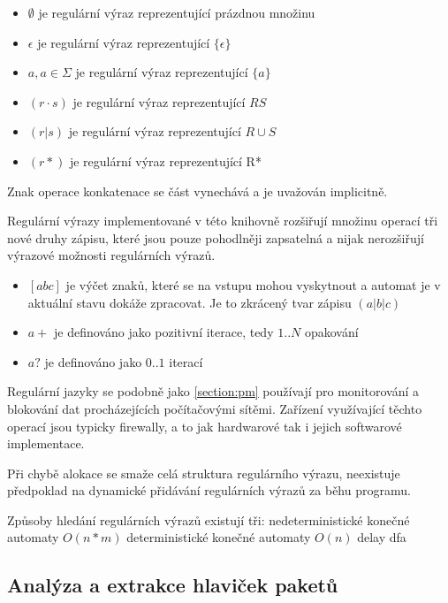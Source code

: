 \begin{itemize}
	\item{$\emptyset$ je regulární výraz reprezentující prázdnou množinu}
	\item{$\epsilon$ je regulární výraz reprezentující $\{\epsilon\}$}
	\item{$a, a \in \Sigma$ je regulární výraz reprezentující $\{a\}$}
	\item{$(r \cdot s)$ je regulární výraz reprezentující $RS$}
	\item{$(r | s)$ je regulární výraz reprezentující $R \cup S$}
	\item{$(r*)$ je regulární výraz reprezentující R*}
\end{itemize}

Znak operace konkatenace %
se část vynechává a je uvažován implicitně.

Regulární výrazy implementované v této knihovně rozšiřují množinu operací tři nové druhy zápisu,
které jsou pouze pohodlněji zapsatelná a nijak nerozšiřují výrazové možnosti regulárních výrazů.

\begin{itemize}
	\item{$[abc]$ je výčet znaků, které se na vstupu mohou vyskytnout a automat je v aktuální stavu dokáže zpracovat. Je to zkrácený tvar zápisu $(a|b|c)$}
	\item{$a+$ je definováno jako pozitivní iterace, tedy $1..N$ opakování}
	\item{$a?$ je definováno jako $0..1$ iterací}
\end{itemize}

Regulární jazyky se podobně jako \ref{section:pm} používají pro monitorování a blokování dat procházejících
počítačovými sítěmi. Zařízení využívající těchto operací jsou typicky firewally, a to jak hardwarové tak i jejich
softwarové implementace.

Při chybě alokace se smaže celá struktura regulárního výrazu, neexistuje předpoklad na
dynamické přidávání regulárních výrazů za běhu programu.


Způsoby hledání regulárních výrazů existují tři:
nedeterministické konečné automaty $O(n*m)$
deterministické konečné automaty $O(n)$
delay dfa \cite{delay-dfa}

\subsection{Analýza a extrakce hlaviček paketů} %

